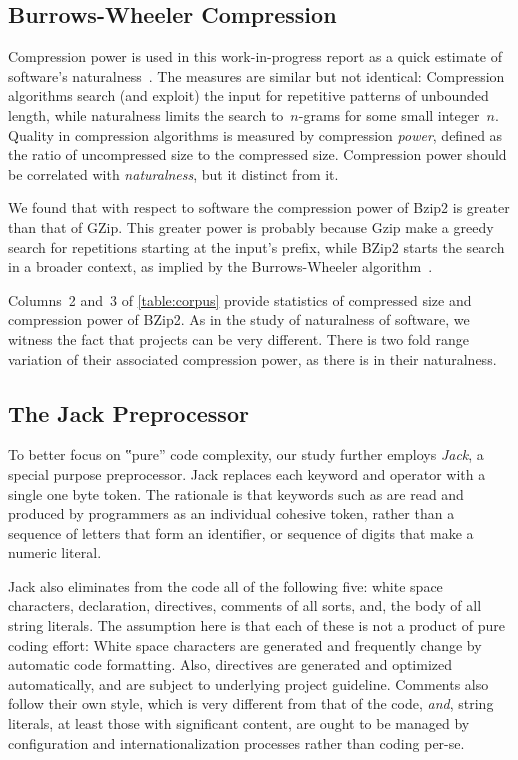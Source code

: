 \subsection{Burrows-Wheeler Compression}
Compression power is used in this work-in-progress report as a quick estimate
of software's naturalness~\cite{Hindle:Bar:Su:Gabel:Devanbu:12}. The
measures are similar but not identical: Compression algorithms search
(and exploit) the input for repetitive patterns of unbounded length, while
naturalness limits the search to~$n$-grams for some small integer~$n$. Quality
in compression algorithms is measured by compression \emph{power}, defined as
the ratio of uncompressed size to the compressed size. Compression power should
be correlated with \emph{naturalness}, but it distinct from it.

We found that with respect to \Java software the compression power of Bzip2 is
greater than that of GZip. This greater power is probably because Gzip make a
greedy search for repetitions starting at the input's prefix, while BZip2
starts the search in a broader context, as implied by the Burrows-Wheeler
algorithm~\cite{Burrows:Wheeler:94}.

Columns~2 and~3 of \cref{table:corpus} provide statistics of compressed size
and compression power of BZip2. As in the study of
naturalness of software, we witness the fact that projects can be very
different. There is two fold range variation of their associated compression
power, as there is in their naturalness.

\subsection{The Jack Preprocessor}

To better focus on ‟pure” code complexity, our study further employs
\emph{Jack}, a special purpose preprocessor. Jack replaces each keyword and
operator with a single one byte token. The rationale is that keywords such as
 are read and produced by programmers as an individual cohesive
token, rather than a sequence of letters that form an identifier, or sequence
of digits that make a numeric literal.

Jack also eliminates from the \Java code all of the following five: white space
characters,  declaration,  directives, comments of all
sorts, and, the body of all string literals. The assumption here is that each
of these is not a product of pure coding effort: White space characters are
generated and frequently change by automatic code formatting. Also, 
directives are generated and optimized automatically, and are subject to
underlying project guideline. Comments also follow their own style, which is
very different from that of the code, \emph{and}, string literals, at least
those with significant content, are ought to be managed by configuration and
internationalization processes rather than coding per-se.

